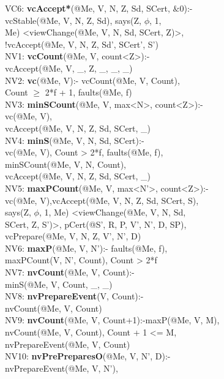 \begin{code}
VC6: \textbf{vcAccept*}(@Me, V, N, Z, Sd, SCert, $\&0$):-\\
\> vcStable(@Me, V, N, Z, Sd), says(Z, $\phi$, 1, \\
\> Me) <viewChange(@Me, V, N, Sd, SCert, Z)>,\\
\> !vcAccept(@Me, V, N, Z, Sd', SCert', S')\\
NV1: \textbf{vcCount}(@Me, V, count<Z>):-\\
\> vcAccept(@Me, V, \_, Z, \_, \_, \_)\\
NV2: \textbf{vc}(@Me, V):- vcCount(@Me, V, Count),\\
\> Count $\geq$ 2*f + 1, faults(@Me, f)\\
NV3: \textbf{minSCount}(@Me, V, max<N>, count<Z>):- \\
\> vc(@Me, V),\\
\> vcAccept(@Me, V, N, Z, Sd, SCert, \_)\\
NV4: \textbf{minS}(@Me, V, N, Sd, SCert):- \\
\> vc(@Me, V), Count > 2*f, faults(@Me, f),\\
\> minSCount(@Me, V, N, Count), \\
\> vcAccept(@Me, V, N, Z, Sd, SCert, \_)\\
NV5: \textbf{maxPCount}(@Me, V, max<N'>, count<Z>):- \\
\> vc(@Me, V),vcAccept(@Me, V, N, Z, Sd, SCert, S),\\
\> says(Z, $\phi$, 1, Me) <viewChange(@Me, V, N, Sd, \\
\> SCert, Z, S')>, pCert(@S', R, P, V', N', D, SP),\\
\> vcPrepare(@Me, V, N, Z, V', N', D)\\
NV6: \textbf{maxP}(@Me, V, N'):- faults(@Me, f),\\
\> maxPCount(V, N', Count), Count > 2*f \\
NV7: \textbf{nvCount}(@Me, V, Count):-\\
\> minS(@Me, V, Count, \_, \_)\\
NV8: \textbf{nvPrepareEvent}(V, Count):-\\
\> nvCount(@Me, V, Count)\\
NV9: \textbf{nvCount}(@Me, V, Count+1):-maxP(@Me, V, M), \\
\> nvCount(@Me, V, Count), Count + 1 <= M, \\
\> nvPrepareEvent(@Me, V, Count)\\
NV10: \textbf{nvPrePreparesO}(@Me, V, N', D):-\\
\> nvPrepareEvent(@Me, V, N'), \\

\end{code}

